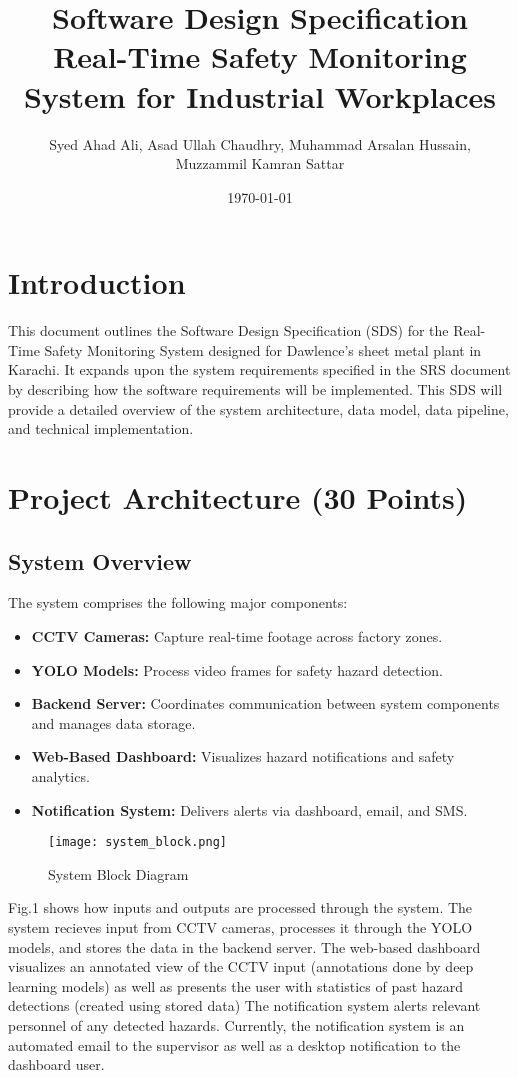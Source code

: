 \documentclass[12pt]{article}
\title{Software Design Specification \\ \large Real-Time Safety Monitoring System for Industrial Workplaces}
\author{Syed Ahad Ali, Asad Ullah Chaudhry, Muhammad Arsalan Hussain, \\ Muzzammil Kamran Sattar}
\date{\today}
\begin{document}
\maketitle
\tableofcontents
\newpage

\section{Introduction}
This document outlines the Software Design Specification (SDS) for the Real-Time Safety Monitoring System designed for Dawlence’s sheet metal plant in Karachi. It expands upon the system requirements specified in the SRS document by describing how the software requirements will be implemented. This SDS will provide a detailed overview of the system architecture, data model, data pipeline, and technical implementation.

\section{Project Architecture (30 Points)}
\subsection{System Overview}
The system comprises the following major components:
\begin{itemize}
    \item \textbf{CCTV Cameras:} Capture real-time footage across factory zones.
    \item \textbf{YOLO Models:} Process video frames for safety hazard detection.
    \item \textbf{Backend Server:} Coordinates communication between system components and manages data storage.
    \item \textbf{Web-Based Dashboard:} Visualizes hazard notifications and safety analytics.
    \item \textbf{Notification System:} Delivers alerts via dashboard, email, and SMS.
\end{itemize}

\begin{figure}[h]
    \centering
    \texttt{[image: system\_block.png]}
    \caption{System Block Diagram}
\end{figure}
Fig.1  shows how inputs and outputs are processed through the system.
The system recieves input from CCTV cameras, processes it through the YOLO models, 
and stores the data in the backend server. The web-based dashboard visualizes an annotated
view of the CCTV input (annotations done by deep learning models) as well as
presents the user with statistics of past hazard detections (created using stored data) 
The notification system alerts relevant personnel of any detected hazards. Currently, the notification system is an automated
email to the supervisor as well as a desktop notification to the dashboard user.
\end{document}
